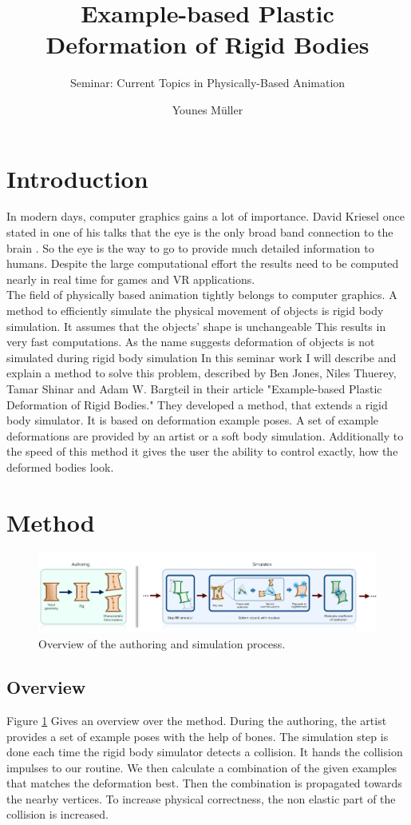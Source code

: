 \documentclass[
	11pt, 
	DIV10,
	a4paper, 
	oneside, 
	headings=normal, 
	captions=tableheading,
	final, 
	numbers=noenddot
]{scrartcl}
\title{Example-based Plastic Deformation of Rigid Bodies}
\subtitle{\vspace{0.5cm}Seminar: Current Topics in Physically-Based Animation}
\author{Younes Müller}
\begin{document}
\maketitle
\tableofcontents
\newpage


\section{Introduction}
In modern days, computer graphics gains a lot of importance. David Kriesel once stated in one of his talks that the eye is the only broad band connection to the brain \cite{dkriesel}. So the eye is the way to go to provide much detailed information to humans.
Despite the large computational effort the results need to be computed nearly in real time for games and VR applications.\\
The field of physically based animation tightly belongs to computer graphics. A method to efficiently simulate the physical movement of objects is rigid body simulation. It assumes that the objects' shape is unchangeable This results in very fast computations. As the name suggests deformation of objects is not simulated during rigid body simulation
In this seminar work I will describe and explain a method to solve this problem, described by Ben Jones, Niles Thuerey, Tamar Shinar and Adam W. Bargteil in their article "Example-based Plastic Deformation of Rigid Bodies."\cite{paper}
They developed a method, that extends a rigid body simulator. It is based on deformation example poses.
A set of example deformations are provided by an artist or a soft body simulation. Additionally to the speed of this method it gives the user the ability to control exactly, how the deformed bodies look. 
\section{Method}
\begin{figure}[tb]
	\centering
	\includegraphics[width=0.8\linewidth]{images/process} 	
	\caption{\label{fig:process} Overview of the authoring and simulation process.\cite{paper}
	}
\end{figure}

\subsection{Overview}
Figure \ref{fig:process} Gives an overview over the method.
During the authoring, the artist provides a set of example poses with the help of bones.
The simulation step is done each time the rigid body simulator detects a collision. It hands the collision impulses to our routine. We then calculate a combination of the given examples that matches the deformation best. Then the combination is propagated towards the nearby vertices. To increase physical correctness, the non elastic part of the collision is increased.
\end{document}
